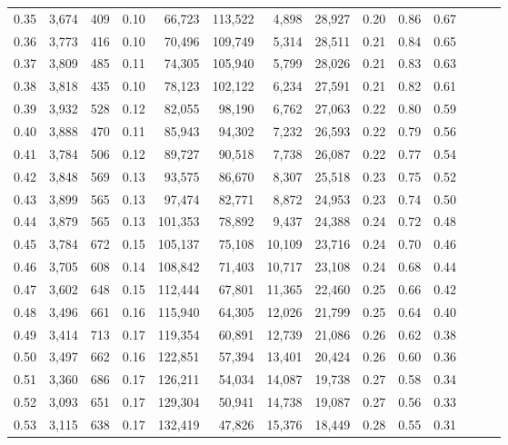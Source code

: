 \begin{tabular}{rrrrrrrrrrrrrr}
0.35 &  3,674 &  409 &  0.10 &   66,723 &  113,522 &   4,898 &  28,927 &  0.20 &  0.86 &      0.67 \\
0.36 &  3,773 &  416 &  0.10 &   70,496 &  109,749 &   5,314 &  28,511 &  0.21 &  0.84 &      0.65 \\
0.37 &  3,809 &  485 &  0.11 &   74,305 &  105,940 &   5,799 &  28,026 &  0.21 &  0.83 &      0.63 \\
0.38 &  3,818 &  435 &  0.10 &   78,123 &  102,122 &   6,234 &  27,591 &  0.21 &  0.82 &      0.61 \\
0.39 &  3,932 &  528 &  0.12 &   82,055 &   98,190 &   6,762 &  27,063 &  0.22 &  0.80 &      0.59 \\
0.40 &  3,888 &  470 &  0.11 &   85,943 &   94,302 &   7,232 &  26,593 &  0.22 &  0.79 &      0.56 \\
0.41 &  3,784 &  506 &  0.12 &   89,727 &   90,518 &   7,738 &  26,087 &  0.22 &  0.77 &      0.54 \\
0.42 &  3,848 &  569 &  0.13 &   93,575 &   86,670 &   8,307 &  25,518 &  0.23 &  0.75 &      0.52 \\
0.43 &  3,899 &  565 &  0.13 &   97,474 &   82,771 &   8,872 &  24,953 &  0.23 &  0.74 &      0.50 \\
0.44 &  3,879 &  565 &  0.13 &  101,353 &   78,892 &   9,437 &  24,388 &  0.24 &  0.72 &      0.48 \\
0.45 &  3,784 &  672 &  0.15 &  105,137 &   75,108 &  10,109 &  23,716 &  0.24 &  0.70 &      0.46 \\
0.46 &  3,705 &  608 &  0.14 &  108,842 &   71,403 &  10,717 &  23,108 &  0.24 &  0.68 &      0.44 \\
0.47 &  3,602 &  648 &  0.15 &  112,444 &   67,801 &  11,365 &  22,460 &  0.25 &  0.66 &      0.42 \\
0.48 &  3,496 &  661 &  0.16 &  115,940 &   64,305 &  12,026 &  21,799 &  0.25 &  0.64 &      0.40 \\
0.49 &  3,414 &  713 &  0.17 &  119,354 &   60,891 &  12,739 &  21,086 &  0.26 &  0.62 &      0.38 \\
0.50 &  3,497 &  662 &  0.16 &  122,851 &   57,394 &  13,401 &  20,424 &  0.26 &  0.60 &      0.36 \\
0.51 &  3,360 &  686 &  0.17 &  126,211 &   54,034 &  14,087 &  19,738 &  0.27 &  0.58 &      0.34 \\
0.52 &  3,093 &  651 &  0.17 &  129,304 &   50,941 &  14,738 &  19,087 &  0.27 &  0.56 &      0.33 \\
0.53 &  3,115 &  638 &  0.17 &  132,419 &   47,826 &  15,376 &  18,449 &  0.28 &  0.55 &      0.31 \\

\end{tabular}
